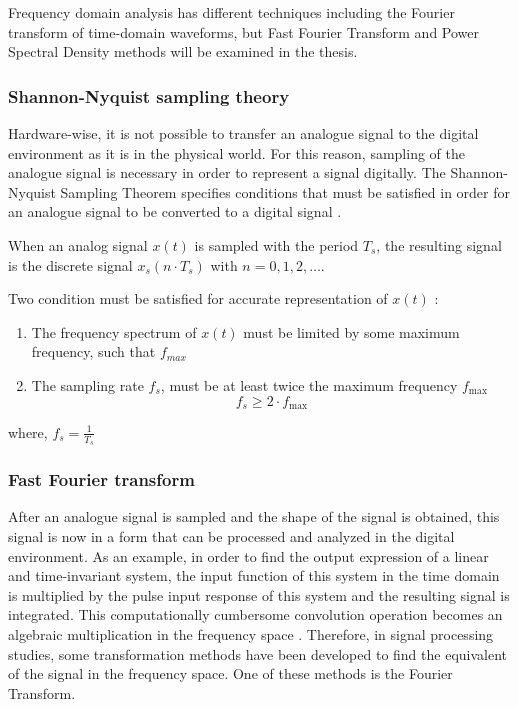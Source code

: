 Frequency domain analysis has different techniques including the Fourier transform of time-domain waveforms, but Fast Fourier Transform and Power Spectral Density methods will be examined in the thesis.

\subsubsection{Shannon-Nyquist sampling theory}

Hardware-wise, it is not possible to transfer an analogue signal to the digital environment as it is in the physical world. For this reason, sampling of the analogue signal is necessary in order to represent a signal digitally. The Shannon-Nyquist Sampling Theorem specifies conditions that must be satisfied in order for an analogue signal to be converted to a digital signal \cite{orfanidis1995introduction}. 

When an analog signal $x(t)$ is sampled with the period $T_s$, the resulting signal is the discrete signal $x_s(n\cdot T_s)$ with $n=0,1,2,\ldots$. 

Two condition must be satisfied for accurate representation of $x(t)$ \cite{orfanidis1995introduction}:
\begin{enumerate}
	\item The frequency spectrum of $x(t)$ must be limited by some maximum frequency, such that $f_{max}$ 
	\item The sampling rate $f_{s}$, must be at least twice the maximum frequency $f_{\max }$
	$$
	f_{s} \geq 2\cdot f_{\max }
	$$
\end{enumerate}
where, $f_s = \displaystyle\frac{1}{T_s}$
\subsubsection{Fast Fourier transform}

After an analogue signal is sampled and the shape of the signal is obtained, this signal is now in a form that can be processed and analyzed in the digital environment. As an example, in order to find the output expression of a linear and time-invariant system, the input function of this system in the time domain is multiplied by the pulse input response of this system and the resulting signal is integrated. This computationally cumbersome convolution operation becomes an algebraic multiplication in the frequency space \cite{cernuda2019relevance}. Therefore, in signal processing studies, some transformation methods have been developed to find the equivalent of the signal in the frequency space. One of these methods is the Fourier Transform.

